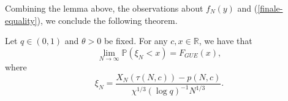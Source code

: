 Combining the lemma above, the observations about $f_N(y)$ and (\ref{finale-equality}), we conclude the following theorem.
\begin{theorem}
Let $q \in (0,1)$ and $\theta > 0$ be fixed. For any $c, x \in \mathbb{R}$, we have that $$\lim_{N \rightarrow \infty} \mathbb{P}(\xi_N < x) = F_{GUE}(x),$$ where $$\xi_N = \frac{X_N(\tau(N,c)) - p(N,c)}{\chi^{1/3} (\log q)^{-1} N^{1/3}}.$$
\end{theorem}